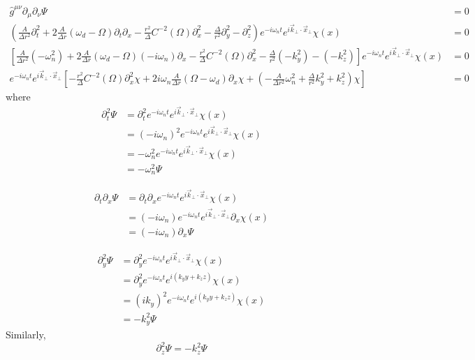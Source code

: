 \documentclass[english]{article}
\begin{document}
\begin{align*}
\hat{g}^{\mu\nu}\partial_{\mu}\partial_{\nu}\Psi & =0\\
\left(\frac{A}{\Delta r^{2}}\partial^{2}_{t}+2\frac{A}{\Delta r}\left(\omega_{d}-\Omega\right)\partial_{t}\partial_{x}-\frac{r^{2}}{\Delta}C^{-2}\left(\Omega\right)\partial^{2}_{x}-\frac{\Delta}{r^{2}}\partial^{2}_{y}-\partial^{2}_{z}\right)e^{-i\omega_{n}t}e^{i\vec{k}_{\bot}\cdot\vec{x}_{\bot}}\chi\left(x\right) & =0\\
\left[\frac{A}{\Delta r^{2}}\left(-\omega^{2}_{n}\right)+2\frac{A}{\Delta r}\left(\omega_{d}-\Omega\right)\left(-i\omega_{n}\right)\partial_{x}-\frac{r^{2}}{\Delta}C^{-2}\left(\Omega\right)\partial^{2}_{x}-\frac{\Delta}{r^{2}}\left(-k^{2}_{y}\right)-\left(-k^{2}_{z}\right)\right]e^{-i\omega_{n}t}e^{i\vec{k}_{\bot}\cdot\vec{x}_{\bot}}\chi\left(x\right) & =0\\
e^{-i\omega_{n}t}e^{i\vec{k}_{\bot}\cdot\vec{x}_{\bot}}\left[-\frac{r^{2}}{\Delta}C^{-2}\left(\Omega\right)\partial^{2}_{x}\chi+2i\omega_{n}\frac{A}{\Delta r}\left(\Omega-\omega_{d}\right)\partial_{x}\chi+\left(-\frac{A}{\Delta r^{2}}\omega^{2}_{n}+\frac{\Delta}{r^{2}}k^{2}_{y}+k^{2}_{z}\right)\chi\right] & =0
\end{align*}
 where 
\begin{align*}
\partial^{2}_{t}\Psi & =\partial^{2}_{t}e^{-i\omega_{n}t}e^{i\vec{k}_{\bot}\cdot\vec{x}_{\bot}}\chi\left(x\right)\\
 & =\left(-i\omega_{n}\right)^{2}e^{-i\omega_{n}t}e^{i\vec{k}_{\bot}\cdot\vec{x}_{\bot}}\chi\left(x\right)\\
 & =-\omega^{2}_{n}e^{-i\omega_{n}t}e^{i\vec{k}_{\bot}\cdot\vec{x}_{\bot}}\chi\left(x\right)\\
 & =-\omega^{2}_{n}\Psi
\end{align*}

\begin{align*}
\partial_{t}\partial_{x}\Psi & =\partial_{t}\partial_{x}e^{-i\omega_{n}t}e^{i\vec{k}_{\bot}\cdot\vec{x}_{\bot}}\chi\left(x\right)\\
 & =\left(-i\omega_{n}\right)e^{-i\omega_{n}t}e^{i\vec{k}_{\bot}\cdot\vec{x}_{\bot}}\partial_{x}\chi\left(x\right)\\
 & =\left(-i\omega_{n}\right)\partial_{x}\Psi
\end{align*}

\begin{align*}
\partial^{2}_{y}\Psi & =\partial^{2}_{y}e^{-i\omega_{n}t}e^{i\vec{k}_{\bot}\cdot\vec{x}_{\bot}}\chi\left(x\right)\\
 & =\partial^{2}_{y}e^{-i\omega_{n}t}e^{i\left(k_{y}y+k_{z}z\right)}\chi\left(x\right)\\
 & =\left(ik_{y}\right)^{2}e^{-i\omega_{n}t}e^{i\left(k_{y}y+k_{z}z\right)}\chi\left(x\right)\\
 & =-k^{2}_{y}\Psi
\end{align*}
 Similarly, 
\[
\partial^{2}_{z}\Psi=-k^{2}_{z}\Psi
\]
\end{document}
